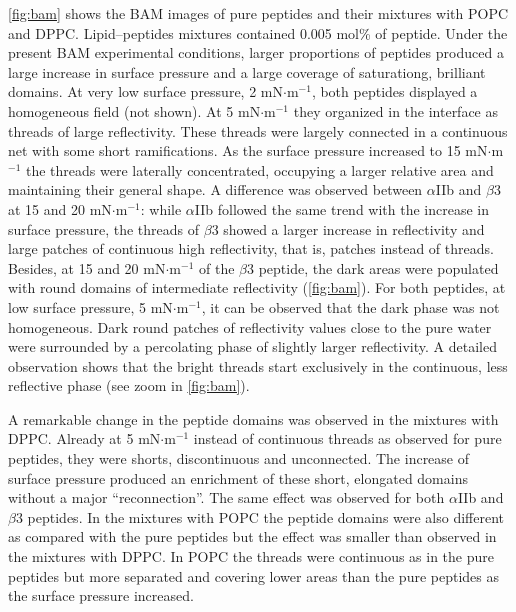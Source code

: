 \documentclass[journal=jacsat,manuscript=article]{achemso}
\begin{document}
\autoref{fig:bam} shows the BAM images of pure peptides and their mixtures with POPC and DPPC. Lipid–peptides mixtures contained 0.005 mol\% of peptide. Under the present BAM experimental conditions, larger proportions of peptides produced a large increase in surface pressure and a large coverage of saturationg, brilliant domains. At very low surface pressure, 2 mN$\cdot$m$^{-1}$, both peptides displayed a homogeneous field (not shown). At 5 mN$\cdot$m$^{-1}$ they organized in the interface as threads of large reflectivity. These threads were largely connected in a continuous net with some short ramifications. As the surface pressure increased to 15 mN$\cdot$m$^{-1}$ the threads were laterally concentrated, occupying a larger relative area and maintaining their general shape. A difference was observed between $\alpha$IIb and $\beta$3 at 15 and 20 mN$\cdot$m$^{-1}$: while $\alpha$IIb followed the same trend with the increase in surface pressure, the threads of $\beta$3 showed a larger increase in reflectivity and large patches of continuous high reflectivity, that is, patches instead of threads. Besides, at 15 and 20 mN$\cdot$m$^{-1}$ of the $\beta$3 peptide, the dark areas were populated with round domains of intermediate reflectivity (\autoref{fig:bam}). For both peptides, at low surface pressure, 5 mN$\cdot$m$^{-1}$, it can be observed that the dark phase was not homogeneous. Dark round patches of reflectivity values close to the pure water were surrounded by a percolating phase of slightly larger reflectivity. A detailed observation shows that the bright threads start exclusively in the continuous, less reflective phase (see zoom in \autoref{fig:bam}).

A remarkable change in the peptide domains was observed in the mixtures with DPPC. Already at 5 mN$\cdot$m$^{-1}$ instead of continuous threads as observed for pure peptides, they were shorts, discontinuous and unconnected. The increase of surface pressure produced an enrichment of these short, elongated domains without a major “reconnection”. The same effect was observed for both $\alpha$IIb and $\beta$3 peptides. In the mixtures with POPC the peptide domains were also different as compared with the pure peptides but the effect was smaller than observed in the mixtures with DPPC. In POPC the threads were continuous as in the pure peptides but more separated and covering lower areas than the pure peptides as the surface pressure increased.
\end{document}
